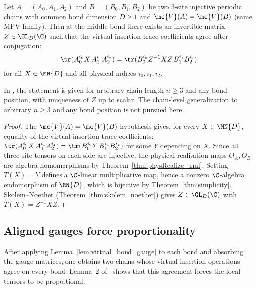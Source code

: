 \begin{lemma}%
    \label{lem:virtual_bond_gauge}
    \leanok
    Let $A = (A_0, A_1, A_2)$ and $B = (B_0, B_1, B_2)$ be two
    3-site injective periodic chains with common bond dimension
    $D \ge 1$ and $\mc{V}(A) = \mc{V}(B)$ (same MPV family).
    Then at the middle bond there exists an invertible matrix
    $Z \in \GL_D(\C)$ such that the virtual-insertion trace
    coefficients agree after conjugation:
    \[
        \tr(A_0^{i_0} X\, A_1^{i_1} A_2^{i_2})
        = \tr(B_0^{i_0} Z^{-1} X Z\, B_1^{i_1} B_2^{i_2})
    \]
    for all $X \in \MN{D}$ and all physical indices $i_0, i_1, i_2$.

    In \cite[Lemma~1]{Molnar2018NormalPEPS}, the statement is given for
    arbitrary chain length $n \ge 3$ and any bond position, with
    uniqueness of $Z$ up to scalar.
    The chain-level generalization to arbitrary $n \ge 3$
    and any bond position is not pursued here.
\end{lemma}

\begin{proof}
    \leanok
    The $\mc{V}(A) = \mc{V}(B)$ hypothesis gives, for every $X \in \MN{D}$,
    equality of the virtual-insertion trace coefficients:
    $\tr(A_0^{i_0} X\, A_1^{i_1} A_2^{i_2})
        = \tr(B_0^{i_0} Y\, B_1^{i_1} B_2^{i_2})$
    for some $Y$ depending on $X$.
    Since all three site tensors on each side are injective,
    the physical realisation maps $O_A, O_B$ are algebra homomorphisms
    by Theorem~\ref{thm:physRealize_mul}.
    Setting $T(X) = Y$ defines a $\C$-linear multiplicative map,
    hence a nonzero $\C$-algebra endomorphism of $\MN{D}$, which is
    bijective by Theorem~\ref{thm:simplicity}.
    Skolem--Noether (Theorem~\ref{thm:skolem_noether}) gives
    $Z \in \GL_D(\C)$ with $T(X) = Z^{-1} X Z$.
\end{proof}

\subsection{Aligned gauges force proportionality}%
\label{sec:tensor_proportional}

After applying Lemma~\ref{lem:virtual_bond_gauge} to each bond and absorbing
the gauge matrices, one obtains two chains whose virtual-insertion
operations agree on every bond. Lemma~2 of~\cite{Molnar2018NormalPEPS}
shows that this agreement forces the local tensors to be proportional.

